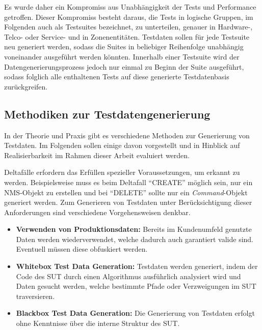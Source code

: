 Es wurde daher ein Kompromiss aus Unabhängigkeit der Tests und Performance getroffen. Dieser Kompromiss besteht daraus, die Tests in logische Gruppen, im Folgenden auch als Testsuites bezeichnet, zu unterteilen, genauer in Hardware-, Telco- oder Service- und in Zonenentitäten. Testdaten sollen für jede Testsuite neu generiert werden, sodass die Suites in beliebiger Reihenfolge unabhängig voneinander ausgeführt werden könnten. Innerhalb einer Testsuite wird der Datengenerierungsprozess jedoch nur einmal zu Beginn der Suite ausgeführt, sodass folglich alle enthaltenen Tests auf diese generierte Testdatenbasis zurückgreifen.

\subsection{Methodiken zur Testdatengenerierung}\label{subsec:methodiken}
In der Theorie und Praxis gibt es verschiedene Methoden zur Generierung von Testdaten. Im Folgenden sollen einige davon vorgestellt und in Hinblick auf Realisierbarkeit im Rahmen dieser Arbeit evaluiert werden.

Deltafälle erfordern das Erfüllen spezieller Voraussetzungen, um erkannt zu werden. Beispielsweise muss es beim Deltafall \enquote{CREATE} möglich sein, nur ein \ac{NMS}-Objekt zu erstellen und bei \enquote{DELETE} sollte nur ein \textit{Command}-Objekt generiert werden. Zum Generieren von Testdaten unter Berücksichtigung dieser Anforderungen sind verschiedene Vorgehensweisen denkbar. 

\begin{itemize}
    \item \textbf{Verwenden von Produktionsdaten:} Bereits im Kundenumfeld genutzte Daten werden wiederverwendet, welche dadurch auch garantiert valide sind. Eventuell müssen diese obfuskiert werden. \cite[S. 240]{witte:2019}
    \item \textbf{Whitebox Test Data Generation:} Testdaten werden generiert, indem der Code des \ac{SUT} durch einen Algorithmus ausführlich analysiert wird und Daten gesucht werden, welche bestimmte Pfade oder Verzweigungen im \ac{SUT} traversieren. \cite{nimpa:2016}
    \item \textbf{Blackbox Test Data Generation:} Die Generierung von Testdaten erfolgt ohne Kenntnisse über die interne Struktur des \ac{SUT}. \cite{nimpa:2016}
\end{itemize}

